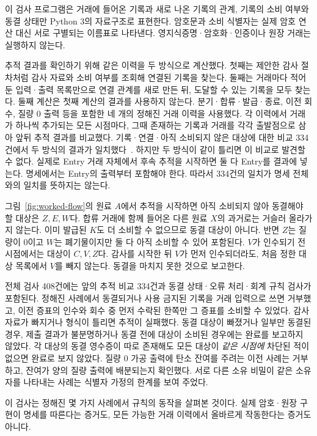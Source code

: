 \label{sec:model-validation}

이 검사 프로그램은 거래에 들어온 기록과 새로 나온 기록의
관계, 기록의 소비 여부와 동결 상태만 Python 3의 자료구조로
표현한다. 암호문과 소비 식별자는 실제 암호 연산 대신
서로 구별되는 이름표로 나타낸다. 영지식증명·암호화·인증이나
원장 거래는 실행하지 않는다.

추적 결과를 확인하기 위해 같은 이력을 두 방식으로 계산했다.
첫째는 제안한 감사 절차처럼 감사 자료와 소비 여부를 조회해
연결된 기록을 찾는다. 둘째는 거래마다 적어 둔 입력·출력
목록만으로 연결 관계를 새로 만든 뒤, 도달할 수 있는 기록을
모두 찾는다. 둘째 계산은 첫째 계산의 결과를 사용하지 않는다.
분기·합류·발급·종료, 이전 회수, 질량 0 출력 등을 포함한
네 개의 정해진 거래 이력을 사용했다. 각 이력에서 거래가
하나씩 추가되는 모든 시점마다, 그때 존재하는 기록과 거래를
각각 출발점으로 삼아 앞뒤 추적 결과를 비교했다.
기록·연결·아직 소비되지 않은 대상에 대한 비교 334건에서
두 방식의 결과가 일치했다~\cite{zkdpp-symbolic-model-2026}.
하지만 두 방식이 같이 틀리면 이 비교로 발견할 수 없다.
실제로 Entry 거래 자체에서 후속 추적을 시작하면 둘 다
Entry를 결과에 넣는다. 명세에서는 Entry의 출력부터
포함해야 한다. 따라서 334건의 일치가 명세 전체와의
일치를 뜻하지는 않는다.

그림~\ref{fig:worked-flow}의 원료 $A$에서 추적을 시작하면
아직 소비되지 않아 동결해야 할 대상은 $Z,E,W$다.
합류 거래에 함께 들어온 다른 원료 $X$의 과거로는
거슬러 올라가지 않는다. 이미 발급된 $K$도 더 소비할
수 없으므로 동결 대상이 아니다. 반면 $Z$는 질량이 0이고
$W$는 폐기물이지만 둘 다 아직 소비할 수 있어 포함된다.
$V$가 인수되기 전 시점에서는 대상이 $C,V,Z$다.
감사를 시작한 뒤 $V$가 먼저 인수되더라도, 처음 정한
대상 목록에서 $V$를 빼지 않는다. 동결을 마치지 못한 것으로
보고한다.

전체 검사 408건에는 앞의 추적 비교 334건과
동결 상태·오류 처리·회계 규칙 검사가 포함된다.
정해진 사례에서 동결되거나 사용 금지된 기록을 거래 입력으로
쓰면 거부했고, 이전 증표의 인수와 회수 중 먼저 수락된
한쪽만 그 증표를 소비할 수 있었다. 감사 자료가 빠지거나
형식이 틀리면 추적이 실패했다. 동결 대상이 빠졌거나
일부만 동결된 경우, 제출 결과가 불분명하거나 동결 전에
대상이 소비된 경우에는 완료를 보고하지 않았다.
각 대상의 동결 영수증이 따로 존재해도 모든 대상이
\emph{같은 시점에} 차단된 적이 없으면 완료로 보지 않았다.
질량 0 가공 출력에 탄소 잔여를 주려는 이전 사례는 거부하고,
잔여가 양의 질량 출력에 배분되는지 확인했다. 서로 다른 소유
비밀이 같은 소유자를 나타내는 사례는 식별자 가정의 한계를
보여 주었다.

이 검사는 정해진 몇 가지 사례에서 규칙의 동작을 살펴본
것이다. 실제 암호·원장 구현이 명세를 따른다는 증거도,
모든 가능한 거래 이력에서 올바르게 작동한다는 증거도 아니다.
